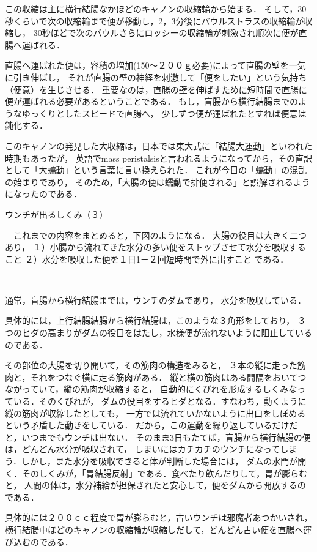 この収縮は主に横行結腸なかほどのキャノンの収縮輪から始まる．
そして，30秒くらいで次の収縮輪まで便が移動し，2，3分後にバウルストラスの収縮輪が収縮し，
30秒ほどで次のバウルさらにロッシーの収縮輪が刺激され順次に便が直腸へ運ばれる．

直腸へ運ばれた便は，容積の増加(150～２００ｇ必要)によって直腸の壁を一気に引き伸ばし，
それが直腸の壁の神経を刺激して「便をしたい」という気持ち（便意）を生じさせる．
重要なのは，直腸の壁を伸ばすために短時間で直腸に便が運ばれる必要があるということである．
もし，盲腸から横行結腸までのようなゆっくりとしたスピードで直腸へ，
少しずつ便が運ばれたとすれば便意は鈍化する． 

このキャノンの発見した大収縮は，日本では東大式に「結腸大運動」といわれた時期もあったが，
英語でmass peristalsisと言われるようになってから，その直訳として「大蠕動」という言葉に言い換えられた．
これが今日の「蠕動」の混乱の始まりであり，
そのため，「大腸の便は蠕動で排便される」と誤解されるようになったのである．

ウンチが出るしくみ（３）

　これまでの内容をまとめると，下図のようになる．
大腸の役目は大きく二つあり，
１）小腸から流れてきた水分の多い便をストップさせて水分を吸収すること
２）水分を吸収した便を１日1－２回短時間で外に出すこと
である．


　 


通常，盲腸から横行結腸までは，ウンチのダムであり，
水分を吸収している．

具体的には，上行結腸結腸から横行結腸は，このような３角形をしており，
３つのヒダの高まりがダムの役目をはたし，水様便が流れないように阻止しているのである．

その部位の大腸を切り開いて，その筋肉の構造をみると，
３本の縦に走った筋肉と，それをつなぐ横に走る筋肉がある．
縦と横の筋肉はある間隔をおいてつながっていて，縦の筋肉が収縮すると，
自動的にくびれを形成するしくみなっている．そのくびれが，
ダムの役目をするヒダとなる．すなわち，動くように縦の筋肉が収縮したとしても，
一方では流れていかないように出口をしぼめるという矛盾した動きをしている．
だから，この運動を繰り返しているだけだと，いつまでもウンチは出ない．
そのまま3日もたてば，盲腸から横行結腸の便は，どんどん水分が吸収されて，
しまいにはカチカチのウンチになってしまう．しかし，また水分を吸収できると体が判断した場合には，
ダムの水門が開く．そのしくみが，「胃結腸反射」である．食べたり飲んだりして，胃が膨らむと，
人間の体は，水分補給が担保されたと安心して，便をダムから開放するのである．

具体的には２００ｃｃ程度で胃が膨らむと，古いウンチは邪魔者あつかいされ，
横行結腸中ほどのキャノンの収縮輪が収縮しだして，どんどん古い便を直腸へ運び込むのである． 

